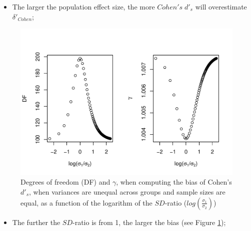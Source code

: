 \documentclass[
  man]{apa6}
\providecommand{\tightlist}{%
  \setlength{\itemsep}{0pt}\setlength{\parskip}{0pt}}
\begin{document}
\begin{itemize}
\tightlist
\item
  The larger the population effect size, the more \(Cohen's \; d'_s\) will overestimate \(\delta'_{Cohen}\);
\end{itemize}

\begin{figure}
\centering
\includegraphics{Theoretical-Bias-of-all-estimators-as-a-function-of-population-parameters_files/figure-latex/biascohendprimehetbalSDratio2-1.pdf}
\caption{\label{fig:biascohendprimehetbalSDratio2}Degrees of freedom (DF) and \(\gamma\), when computing the bias of Cohen's \(d'_s\), when variances are unequal across groups and sample sizes are equal, as a function of the logarithm of the \(SD\)-ratio (\(log \left( \frac{\sigma_1}{\sigma_2} \right)\))}
\end{figure}

\begin{itemize}
\tightlist
\item
  The further the \(SD\)-ratio is from 1, the larger the bias (see Figure \ref{fig:biascohendprimehetbalSDratio2});
\end{itemize}
\end{document}
